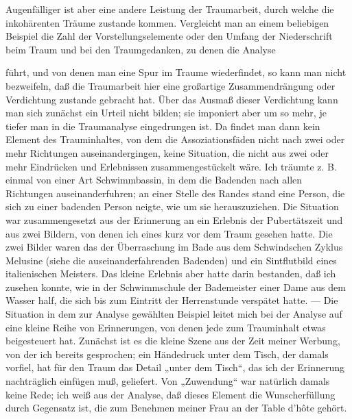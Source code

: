 \documentclass{article}
\begin{document}
            
        \pstart
        Augenfälliger ist aber eine andere Leistung der Traumarbeit, durch welche die
               inkohärenten Träume zustande kommen. Vergleicht man an einem
               beliebigen Beispiel die Zahl der Vorstellungselemente oder den Umfang
               der Niederschrift beim Traum und bei den Traumgedanken, zu denen die Analyse
        \pend
    
         
            
            
            
        \pstart
        führt, und von denen man eine Spur im Traume wiederfindet, so kann
               man nicht bezweifeln, daß die Traumarbeit hier eine großartige Zusammendrängung
               oder Verdichtung zustande gebracht hat. Über das
               Ausmaß dieser Verdichtung kann man sich zunächst ein Urteil nicht bilden; sie
               imponiert aber um so mehr, je tiefer man in die Traumanalyse eingedrungen ist.
               Da findet man dann kein Element des Trauminhaltes, von dem die
               Assoziationsfäden nicht nach zwei oder mehr Richtungen auseinandergingen, keine Situation, die nicht aus zwei oder mehr Eindrücken und
               Erlebnissen zusammengestückelt wäre. Ich träumte z. B. einmal von einer Art
               Schwimmbassin, in dem die Badenden nach allen Richtungen auseinanderfuhren; an
               einer Stelle des Randes stand eine Person, die sich zu einer badenden
               Person neigte, wie um sie herauszuziehen. Die Situation war zusammengesetzt aus
               der Erinnerung an ein Erlebnis der Pubertätszeit und aus zwei
               Bildern, von denen ich eines kurz vor dem Traum gesehen hatte. Die zwei Bilder
               waren das der Überraschung im Bade aus dem Schwindschen Zyklus Melusine (siehe die
               auseinanderfahrenden Badenden) und ein Sintflutbild eines italienischen
               Meisters. Das kleine Erlebnis aber hatte darin bestanden, daß ich zusehen
               konnte, wie in der Schwimmschule der Bademeister einer Dame aus dem Wasser half,
               die sich bis zum Eintritt der Herrenstunde verspätet hatte. — Die Situation
               in dem zur Analyse gewählten Beispiel leitet mich bei der Analyse auf
               eine kleine Reihe von Erinnerungen, von denen jede zum Trauminhalt etwas
               beigesteuert hat. Zunächst ist es die kleine Szene aus der Zeit meiner Werbung,
               von der ich bereits gesprochen; ein Händedruck unter dem Tisch, der damals
               vorfiel, hat für den Traum das Detail „unter dem Tisch“, das ich der
               Erinnerung nachträglich einfügen muß, geliefert. Von „Zuwendung“ war
               natürlich damals keine Rede; ich weiß aus der Analyse, daß dieses
               Element die Wunscherfüllung durch Gegensatz ist, die zum Benehmen meiner Frau an
               der Table d’hôte gehört.
        \pend
    
\end{document}
